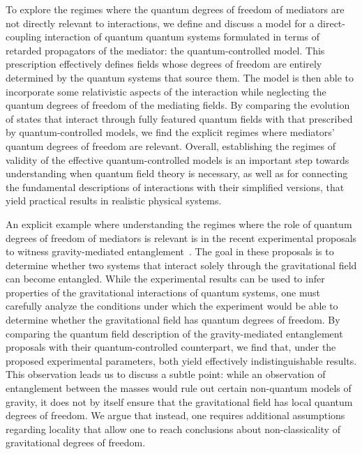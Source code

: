 \documentclass[letterpaper,12pt,titlepage,oneside,final]{book}
\begin{document}

To explore the regimes where the quantum degrees of freedom of mediators are not directly relevant to interactions, we define and discuss a model for a direct-coupling interaction of quantum quantum systems formulated in terms of retarded propagators of the mediator: the quantum-controlled model. This prescription effectively defines fields whose degrees of freedom are entirely determined by the quantum systems that source them. The model is then able to incorporate some relativistic aspects of the interaction while neglecting the quantum degrees of freedom of the mediating fields. By comparing the evolution of states that interact through fully featured quantum fields with that prescribed by quantum-controlled models, we find the explicit regimes where mediators' quantum degrees of freedom are relevant. Overall, establishing the regimes of validity of the effective quantum-controlled models is an important step towards understanding when quantum field theory is necessary, as well as for connecting the fundamental descriptions of interactions with their simplified versions, that yield practical results in realistic physical systems.

An explicit example where understanding the regimes where the role of quantum degrees of freedom of mediators is relevant is in the recent experimental proposals to witness gravity-mediated entanglement~\cite{B,MV}. The goal in these proposals is to determine whether two systems that interact solely through the gravitational field can become entangled. While the experimental results can be used to infer properties of the gravitational interactions of quantum systems, one must carefully analyze the conditions under which the experiment would be able to determine whether the gravitational field has quantum degrees of freedom. By comparing the quantum field description of the gravity-mediated entanglement proposals with their quantum-controlled counterpart, we find that, under the proposed experimental parameters, both yield effectively indistinguishable results. This observation leads us to discuss a subtle point: while an observation of entanglement between the masses would rule out certain non-quantum models of gravity, it does not by itself ensure that the gravitational field has local quantum degrees of freedom. We argue that instead, one requires additional assumptions regarding locality that allow one to reach conclusions about non-classicality of gravitational degrees of freedom.
\end{document}
